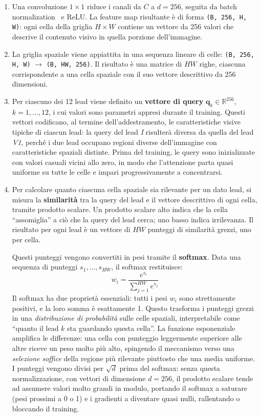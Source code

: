 \begin{enumerate}
    \item Una convoluzione $1\times1$ riduce i canali da $C$ a $d = 256$, seguita da batch normalization~\cite{ioffe2015batchnormalization} e ReLU. La feature map risultante è di forma \texttt{(B, 256, H, W)}: ogni cella della griglia $H \times W$ contiene un vettore da 256 valori che descrive il contenuto visivo in quella porzione dell'immagine.

    \item La griglia spaziale viene appiattita in una sequenza lineare di celle: \texttt{(B, 256, H, W)} $\to$ \texttt{(B, HW, 256)}. Il risultato è una matrice di $HW$ righe, ciascuna corrispondente a una cella spaziale con il suo vettore descrittivo da 256 dimensioni.

    \item Per ciascuno dei 12 lead viene definito un \textbf{vettore di query} $\mathbf{q}_k \in \mathbb{R}^{256}$, $k = 1, \ldots, 12$, i cui valori sono parametri appresi durante il training. Questi vettori codificano, al termine dell'addestramento, le caratteristiche visive tipiche di ciascun lead: la query del lead \textit{I} risulterà diversa da quella del lead \textit{V1}, perché i due lead occupano regioni diverse dell'immagine con caratteristiche spaziali distinte. Prima del training, le query sono inizializzate con valori casuali vicini allo zero, in modo che l'attenzione parta quasi uniforme su tutte le celle e impari progressivamente a concentrarsi.

    \item Per calcolare quanto ciascuna cella spaziale sia rilevante per un dato lead, si misura la \textbf{similarità} tra la query del lead e il vettore descrittivo di ogni cella, tramite prodotto scalare. Un prodotto scalare alto indica che la cella ``assomiglia'' a ciò che la query del lead cerca; uno basso indica irrilevanza. Il risultato per ogni lead è un vettore di $HW$ punteggi di similarità grezzi, uno per cella.

    Questi punteggi vengono convertiti in pesi tramite il \textbf{softmax}. Data una sequenza di punteggi $s_1, \ldots, s_{HW}$, il softmax restituisce:
    \[
        w_i = \frac{e^{s_i}}{\displaystyle\sum_{j=1}^{HW} e^{s_j}}
    \]
    Il softmax ha due proprietà essenziali: tutti i pesi $w_i$ sono strettamente positivi, e la loro somma è esattamente 1. Questo trasforma i punteggi grezzi in una \textit{distribuzione di probabilità} sulle celle spaziali, interpretabile come ``quanto il lead $k$ sta guardando questa cella''. La funzione esponenziale amplifica le differenze: una cella con punteggio leggermente superiore alle altre riceve un peso molto più alto, spingendo il meccanismo verso una \textit{selezione soffice} della regione più rilevante piuttosto che una media uniforme. I punteggi vengono divisi per $\sqrt{d}$ prima del softmax: senza questa normalizzazione, con vettori di dimensione $d = 256$, il prodotto scalare tende ad assumere valori molto grandi in modulo, portando il softmax a saturare (pesi prossimi a 0 o 1) e i gradienti a diventare quasi nulli, rallentando o bloccando il training.


\end{enumerate}
